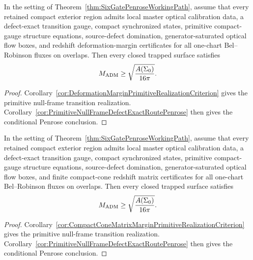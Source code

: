 \begin{corollary}\label{cor:DeformationMarginLocalRoutePenrose}
In the setting of Theorem~\ref{thm:SixGatePenroseWorkingPath}, assume that every retained compact exterior region admits local master optical calibration data, a defect-exact transition gauge, compact synchronized states, primitive compact-gauge structure equations, source-defect domination, generator-saturated optical flow boxes, and redshift deformation-margin certificates for all one-chart Bel--Robinson fluxes on overlaps. Then every closed trapped surface satisfies
\[
    M_{\mathrm{ADM}}\ge \sqrt{\frac{A(\Sigma_0)}{16\pi}} .
\]
\end{corollary}

\begin{proof}
Corollary~\ref{cor:DeformationMarginPrimitiveRealizationCriterion} gives the primitive null-frame transition realization.  Corollary~\ref{cor:PrimitiveNullFrameDefectExactRoutePenrose} then gives the conditional Penrose conclusion.
\end{proof}

\begin{corollary}\label{cor:CompactConeMatrixMarginLocalRoutePenrose}
In the setting of Theorem~\ref{thm:SixGatePenroseWorkingPath}, assume that every
retained compact exterior region admits local master optical calibration data, a
defect-exact transition gauge, compact synchronized states, primitive
compact-gauge structure equations, source-defect domination, generator-saturated
optical flow boxes, and finite compact-cone redshift matrix certificates for all
one-chart Bel--Robinson fluxes on overlaps. Then every closed trapped surface
satisfies
\[
    M_{\mathrm{ADM}}\ge \sqrt{\frac{A(\Sigma_0)}{16\pi}} .
\]
\end{corollary}

\begin{proof}
Corollary~\ref{cor:CompactConeMatrixMarginPrimitiveRealizationCriterion} gives
the primitive null-frame transition realization.  Corollary~\ref{cor:PrimitiveNullFrameDefectExactRoutePenrose}
then gives the conditional Penrose conclusion.
\end{proof}

